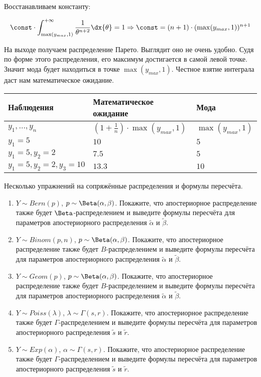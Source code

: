 \begin{problem}
\begin{sol}
Восстанавливаем константу: 

\[
\const \cdot \int_{\max(y_{max},1)}^{+\infty} \frac{1}{\theta^{n+2}} \dx{\theta} = 1  \Rightarrow  \const = (n+1)\cdot(\max(y_{max},1))^{n+1}
\]

На выходе получаем распределение Парето. Выглядит оно не очень удобно. Судя по форме этого распределения, его максимум достигается в самой левой точке. Значит мода будет находиться в точке $\max(y_{max},1)$. Честное взятие интеграла даст нам математическое ожидание.

\begin{tabularx}{\textwidth}{X|X|X}
Наблюдения & Математическое ожидание & Мода \\
\hline
$y_1, \ldots, y_n$ & $(1 + \frac{1}{n}) \cdot \max(y_{max},1)$ & $\max(y_{max},1)$ \\
$y_1 = 5$ & $10$ & $5$ \\
$y_1 = 5, y_2 = 2$ & $7.5$ & $5$ \\
$y_1=5, y_2=2, y_3=10$ &  $13.3$ & $10$ 
\end{tabularx}


\end{sol}
\end{problem}


\begin{problem}
	Несколько упражнений на сопряжённые распределения и формулы пересчёта. 
	\begin{enumerate} 
		\item $Y \sim Bern(p)$, $p \sim \Beta(\alpha, \beta)$. Покажите, что апостериорное распределение также будет $\Beta$-распределением и выведите формулы пересчёта для параметров апостериорного распределения $\tilde{\alpha} $ и $\tilde \beta$.
		\item $Y \sim Binom(p,n)$,  $p \sim \Beta(\alpha, \beta)$. Покажите, что апостериорное распределение также будет $B$-распределением и выведите формулы пересчёта для параметров апостериорного распределения $\tilde{\alpha} $ и $\tilde \beta$.
		\item  $Y \sim Geom(p)$,  $p \sim \Beta(\alpha, \beta)$. Покажите, что апостериорное распределение также будет $B$-распределением и выведите формулы пересчёта для параметров апостериорного распределения $\tilde{\alpha} $ и $\tilde \beta$.
		\item  $Y \sim Poiss(\lambda)$, $\lambda \sim  \Gamma(s,r)$. Покажите, что апостериорное распределение также будет $\Gamma$-распределением и выведите формулы пересчёта для параметров апостериорного распределения $\tilde{s} $ и $\tilde r$.
		\item $Y \sim Exp(\alpha)$, $\alpha \sim \Gamma(s,r)$. Покажите, что апостериорное распределение также будет $\Gamma$-распределением и выведите формулы пересчёта для параметров апостериорного распределения $\tilde{s} $ и $\tilde r$.
	\end{enumerate}
	\begin{sol}
	\end{sol}
\end{problem}


